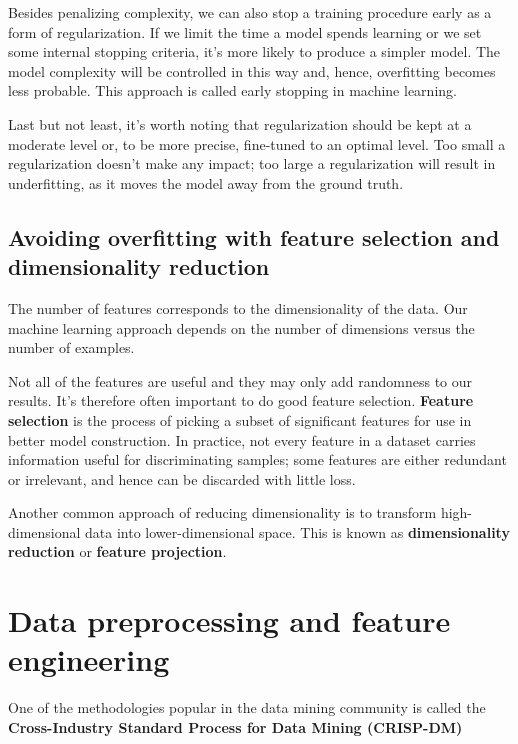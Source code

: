 Besides penalizing complexity, we can also stop a training procedure early as a form of regularization. If we limit the time a model spends learning or we set some internal stopping criteria, it's more likely to produce a simpler model. The model complexity will be controlled in this way and, hence, overfitting becomes less probable. This approach is called early stopping in machine learning.

Last but not least, it's worth noting that regularization should be kept at a moderate level or, to be more precise, fine-tuned to an optimal level. Too small a regularization doesn't make any impact; too large a regularization will result in underfitting, as it moves the model away from the ground truth.
\subsection{Avoiding overfitting with feature selection and dimensionality reduction}

The number of features corresponds to the dimensionality of the data. Our machine learning approach depends on the number of dimensions versus the number of examples.

Not all of the features are useful and they may only add randomness to our results. It's therefore often important to do good feature selection. \textbf{Feature selection} is the process of picking a subset of significant features for use in better model construction. In practice, not every feature in a dataset carries information useful for discriminating samples; some features are either redundant or irrelevant, and hence can be discarded with little loss.

Another common approach of reducing dimensionality is to transform high-dimensional data into lower-dimensional space. This is known as \textbf{dimensionality reduction} or \textbf{feature projection}.

\section{Data preprocessing and feature engineering}
One of the methodologies popular in the data mining community is called the \textbf{Cross-Industry Standard Process for Data Mining (CRISP-DM)}

